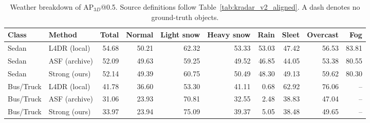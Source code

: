 \begin{table}[t]
\centering
\scriptsize
\caption{Weather breakdown of AP$_{3D}$@0.5. Source definitions follow Table~\ref{tab:kradar_v2_aligned}. A dash denotes no ground-truth objects.}
\begin{tabular}{llrrrrrrrr}
\toprule
Class & Method & Total & Normal & Light snow & Heavy snow & Rain & Sleet & Overcast & Fog \\
\midrule
Sedan & L4DR (local) & 54.68 & 50.21 & 62.32 & 53.33 & 53.03 & 47.42 & 56.53 & 83.81 \\
Sedan & ASF (archive) & 52.09 & 49.63 & 59.25 & 49.52 & 46.85 & 44.05 & 53.38 & 80.55 \\
Sedan & Strong (ours) & 52.14 & 49.39 & 60.75 & 50.49 & 48.30 & 49.13 & 59.62 & 80.30 \\
Bus/Truck & L4DR (local) & 41.78 & 36.60 & 53.30 & 41.11 & 0.68 & 62.92 & 76.06 & -- \\
Bus/Truck & ASF (archive) & 31.06 & 23.93 & 70.81 & 32.55 & 2.48 & 38.83 & 47.04 & -- \\
Bus/Truck & Strong (ours) & 33.97 & 23.94 & 75.09 & 39.37 & 5.05 & 38.48 & 49.65 & -- \\
\bottomrule
\end{tabular}
\end{table}
